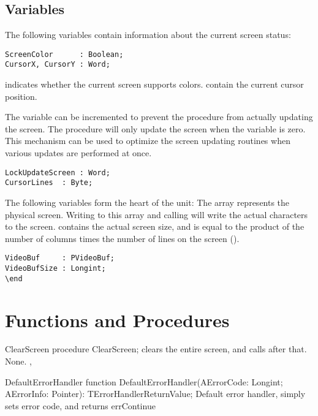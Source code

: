 \subsection{Variables}
The following variables contain information about the current screen
status:
\begin{verbatim}
ScreenColor      : Boolean;
CursorX, CursorY : Word;
\end{verbatim}
 indicates whether the current screen supports colors.
 contain the current cursor position.

The  variable can be incremented to prevent the 
 procedure from actually updating the screen. The 
 procedure will only update the screen when the
 variable is zero. This mechanism can be used
to optimize the screen updating routines when various updates are 
performed at once.
\begin{verbatim}
LockUpdateScreen : Word;
CursorLines  : Byte;
\end{verbatim}
The following variables form the heart of the  unit: The
 array represents the physical screen. Writing to this
array and calling  will write the actual characters
to the screen.  contains the actual screen size, and is
equal to the product of the number of columns times the number of lines 
on the screen ().
\begin{verbatim}
VideoBuf     : PVideoBuf;
VideoBufSize : Longint;
\end
\end{verbatim}

\section{Functions and Procedures}

\begin{procedure}{ClearScreen}
\Declaration
procedure ClearScreen; 
\Description
{} clears the entire screen, and calls 
after that.
\Errors
None.
\SeeAlso
{}, 
\end{procedure}

\begin{procedure}{DefaultErrorHandler}
\Declaration
function  DefaultErrorHandler(AErrorCode: Longint; AErrorInfo: Pointer): TErrorHandlerReturnValue; 
\Description
{ Default error handler, simply sets error code, and returns errContinue }
\Errors
\SeeAlso
\end{procedure}

